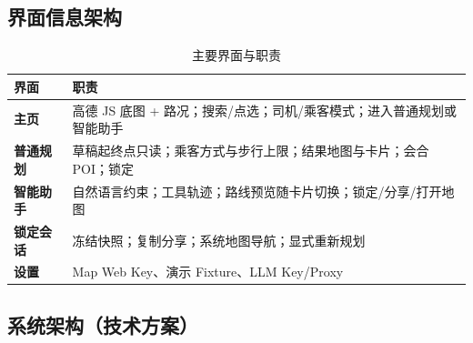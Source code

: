 \documentclass[UTF8,a4paper,zihao=-4]{ctexart}
\begin{document}
\subsection{界面信息架构}

\begin{table}[H]
\centering
{}
\begin{tabularx}{\textwidth}{>{\bfseries}p{2.5cm}X}
\toprule
界面 & 职责 \\
\midrule
主页 & 高德 JS 底图 + 路况；搜索/点选；司机/乘客模式；进入普通规划或智能助手 \\
普通规划 & 草稿起终点只读；乘客方式与步行上限；结果地图与卡片；会合 POI；锁定 \\
智能助手 & 自然语言约束；工具轨迹；路线预览随卡片切换；锁定/分享/打开地图 \\
锁定会话 & 冻结快照；复制分享；系统地图导航；显式重新规划 \\
设置 & Map Web Key、演示 Fixture、LLM Key/Proxy \\
\bottomrule
\end{tabularx}
\caption{主要界面与职责}
\label{tab:screens}
\end{table}

\subsection{系统架构（技术方案）}
\end{document}
